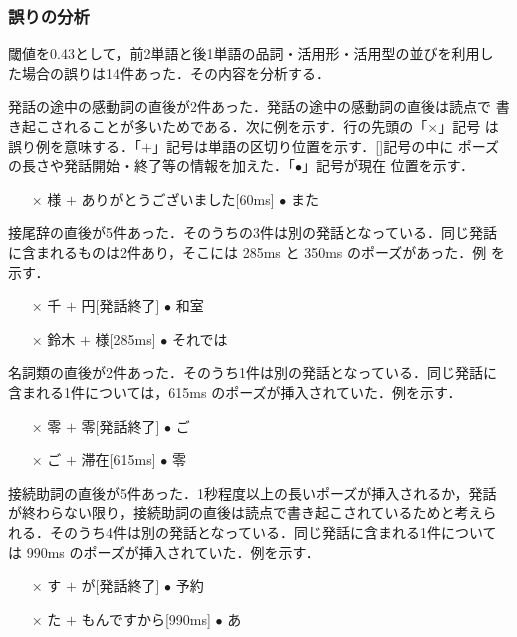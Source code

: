 \vspace{-1mm}
\subsubsection{誤りの分析}
\vspace{-1mm}

閾値を0.43として，前2単語と後1単語の品詞・活用形・活用型の並びを利用し
た場合の誤りは14件あった．その内容を分析する．

発話の途中の感動詞の直後が2件あった．発話の途中の感動詞の直後は読点で
書き起こされることが多いためである．次に例を示す．行の先頭の「×」記号
は誤り例を意味する．「$+$」記号は単語の区切り位置を示す．[]記号の中に
ポーズの長さや発話開始・終了等の情報を加えた．「$\bullet$」記号が現在
位置を示す．

\begin{itemize}
\item[×] 様 $+$ ありがとうございました[60ms] $\bullet$ また
\end{itemize}

接尾辞の直後が5件あった．そのうちの3件は別の発話となっている．同じ発話
に含まれるものは2件あり，そこには 285ms と 350ms のポーズがあった．例
を示す．

\begin{itemize}
\item[×] 千 $+$ 円[発話終了] $\bullet$ 和室
\item[×] 鈴木 $+$ 様[285ms] $\bullet$ それでは
\end{itemize}

名詞類の直後が2件あった．そのうち1件は別の発話となっている．同じ発話に
含まれる1件については，615ms のポーズが挿入されていた．例を示す．

\begin{itemize}
\item[×] 零 $+$ 零[発話終了] $\bullet$ ご
\item[×] ご $+$ 滞在[615ms] $\bullet$ 零
\end{itemize}

接続助詞の直後が5件あった．1秒程度以上の長いポーズが挿入されるか，発話
が終わらない限り，接続助詞の直後は読点で書き起こされているためと考えら
れる．そのうち4件は別の発話となっている．同じ発話に含まれる1件について
は 990ms のポーズが挿入されていた．例を示す．

\begin{itemize}
\item[×] す $+$ が[発話終了] $\bullet$ 予約
\item[×] た $+$ もんですから[990ms] $\bullet$ あ
\end{itemize}

